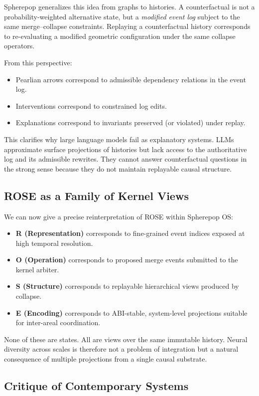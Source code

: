 \documentclass[11pt]{article}
\begin{document}
Spherepop generalizes this idea from graphs to histories. A counterfactual is not a probability-weighted alternative state, but a \emph{modified event log} subject to the same merge--collapse constraints. Replaying a counterfactual history corresponds to re-evaluating a modified geometric configuration under the same collapse operators.

From this perspective:
\begin{itemize}
\item Pearlian arrows correspond to admissible dependency relations in the event log.
\item Interventions correspond to constrained log edits.
\item Explanations correspond to invariants preserved (or violated) under replay.
\end{itemize}

This clarifies why large language models fail as explanatory systems. LLMs approximate surface projections of histories but lack access to the authoritative log and its admissible rewrites. They cannot answer counterfactual questions in the strong sense because they do not maintain replayable causal structure.

\subsection{ROSE as a Family of Kernel Views}

We can now give a precise reinterpretation of ROSE within Spherepop OS:
\begin{itemize}
\item \textbf{R (Representation)} corresponds to fine-grained event indices exposed at high temporal resolution.
\item \textbf{O (Operation)} corresponds to proposed merge events submitted to the kernel arbiter.
\item \textbf{S (Structure)} corresponds to replayable hierarchical views produced by collapse.
\item \textbf{E (Encoding)} corresponds to ABI-stable, system-level projections suitable for inter-areal coordination.
\end{itemize}

None of these are states. All are views over the same immutable history. Neural diversity across scales is therefore not a problem of integration but a natural consequence of multiple projections from a single causal substrate.

\subsection{Critique of Contemporary Systems}
\end{document}
